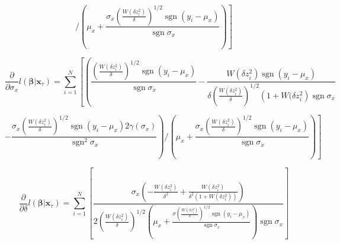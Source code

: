 \documentclass[8pt,oneside]{extbook}
\newcommand{\vect}[1]{\boldsymbol{#1}}
\DeclareMathOperator*{\sgn}{sgn}
\begin{document}
$$
\left.\bigg/\left(
    \mu_x+\frac{
\sigma_x\left(\frac{W(\delta z_i^2)}{\delta}\right)^{1/2}
\sgn(y_i-\mu_x)}{\sgn\sigma_x}
\right)
\right]
$$

$$
\frac{\partial}{\partial \sigma_x}l(\vect{\beta}|\vect{x}_\tau)
=
\sum_{i=1}^N\left[
\left(
\frac{\left(\frac{W(\delta z_i^2)}{\delta}\right)^{1/2}
\sgn(y_i-\mu_x)}
{\sgn\sigma_x}
-
\frac{W(\delta z_i^2)\sgn(y_i-\mu_x)}
{\delta\left(\frac{W(\delta z_i^2)}{\delta}\right)^{1/2}
\left(1+W(\delta z_i^2\right)
\sgn\sigma_x}
\right.
\right.
$$

$$\left.
\left.
    -\frac{\sigma_x\left(\frac{W(\delta z_i^2)}{\delta}\right)^{1/2}
    \sgn(y_i-\mu_x)2\gamma(\sigma_x)}
    {\sgn^2\sigma_x}
\right)
\bigg/\left(
\mu_x+
\frac{\sigma_x\left(\frac{W(\delta z_i^2)}{\delta}\right)^{1/2}\sgn(y_i-\mu_x)}
{\sgn\sigma_x}
\right)
\right]
$$

$$
\frac{\partial}{\partial \delta}l(\vect{\beta}|\vect{x}_\tau)
=
\sum_{i=1}^N\left[
    \frac{
        \sigma_x\left(-\frac{W(\delta z_i^2)}{\delta^2}
            +\frac{W(\delta z_i^2)}{\delta^2(1+W(\delta z_i^2))}
        \right)
    }{
    2\left(\frac{W(\delta z_i^2)}{\delta}\right)^{1/2}
    \left(
        \mu_x+\frac{
            \sigma\left(\frac{W(\delta z_i^2)}{\delta}\right)^{1/2}
        \sgn(y_i-\mu_x)}
        {\sgn\sigma_x}
    \right)
    \sgn\sigma_x
}
\right]
$$
\end{document}
